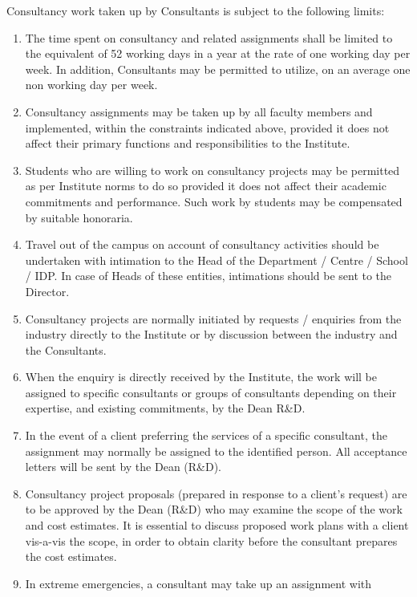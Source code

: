 \documentclass[
  10pt,
  a5paper,
  10pt,
  openany]{amsbook}
\begin{document}
Consultancy work taken up by Consultants is subject to the following
limits:

\begin{enumerate}
\def\labelenumi{\arabic{enumi}.}
\item
  The time spent on consultancy and related assignments shall be limited
  to the equivalent of 52 working days in a year at the rate of one
  working day per week. In addition, Consultants may be permitted to
  utilize, on an average one non working day per week.
\item
  Consultancy assignments may be taken up by all faculty members and
  implemented, within the constraints indicated above, provided it does
  not affect their primary functions and responsibilities to the
  Institute.
\item
  Students who are willing to work on consultancy projects may be
  permitted as per Institute norms to do so provided it does not affect
  their academic commitments and performance. Such work by students may
  be compensated by suitable honoraria.
\item
  Travel out of the campus on account of consultancy activities should
  be undertaken with intimation to the Head of the Department / Centre /
  School / IDP. In case of Heads of these entities, intimations should
  be sent to the Director.
\item
  Consultancy projects are normally initiated by requests / enquiries
  from the industry directly to the Institute or by discussion between
  the industry and the Consultants.
\item
  When the enquiry is directly received by the Institute, the work will
  be assigned to specific consultants or groups of consultants depending
  on their expertise, and existing commitments, by the Dean R\&D.
\item
  In the event of a client preferring the services of a specific
  consultant, the assignment may normally be assigned to the identified
  person. All acceptance letters will be sent by the Dean (R\&D).
\item
  Consultancy project proposals (prepared in response to a client's
  request) are to be approved by the Dean (R\&D) who may examine the
  scope of the work and cost estimates. It is essential to discuss
  proposed work plans with a client vis-a-vis the scope, in order to
  obtain clarity before the consultant prepares the cost estimates.
\item
  In extreme emergencies, a consultant may take up an assignment with

\end{enumerate}
\end{document}
